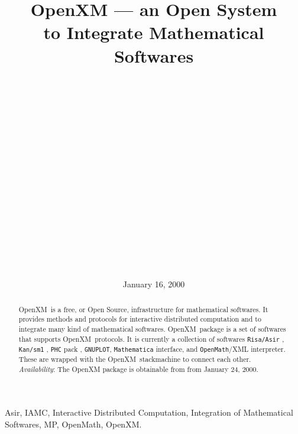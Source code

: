 \documentclass[submit]{acmconf}
\def\OpenXM{{\rm OpenXM\ }}
\begin{document}
\date{January 16, 2000}
\title{OpenXM 
      --- an Open System \\ to Integrate Mathematical Softwares}
\author{\\
         \\
         \\
         \and
         \\
         \\
         \and
         \\
         \\
         \and
         \\
         \\
         \and
         \\
         \\
         \and
         \\
         \\
       }
\maketitle

\begin{abstract}
\OpenXM is a free, or Open Source, infrastructure for mathematical
softwares.
It provides methods and protocols 
for interactive distributed computation and
to integrate many kind of mathematical softwares.
\OpenXM package is a set of softwares that supports \OpenXM protocols.
It is currently a collection of softwares
{\tt Risa/Asir} \cite{asir}, {\tt Kan/sm1} \cite{kan}, {\tt PHC} pack \cite{phc}, {\tt GNUPLOT},
{\tt Mathematica} interface, and
{\tt OpenMath}/XML \cite{OpenMath} interpreter.
These are wrapped with the \OpenXM stackmachine
to connect each other.
{\it Availability}: The OpenXM package is obtainable from \cite{openxm-web}
from January 24, 2000.
\end{abstract}

\begin{keywords}
Asir,
IAMC, Interactive Distributed Computation, 
Integration of Mathematical Softwares,
MP, OpenMath, OpenXM. 
\end{keywords}




















\end{document}
